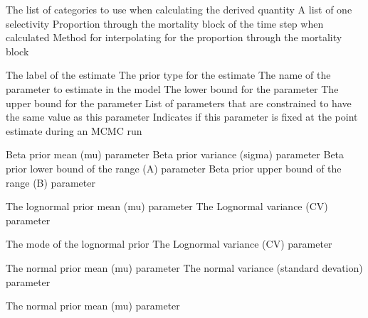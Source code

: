  {The list of categories to use when calculating the derived quantity}
 {A list of one selectivity}
 {Proportion through the mortality block of the time step when calculated}
 {Method for interpolating for the proportion through the mortality block}
\par\textbf{}\par
\par\textbf{}\par
{}\par\par
{} {The label of the estimate}
 {The prior type for the estimate}
 {The name of the parameter to estimate in the model}
 {The lower bound for the parameter}
 {The upper bound for the parameter}
 {List of parameters that are constrained to have the same value as this parameter}
 {Indicates if this parameter is fixed at the point estimate during an MCMC run}
\par\textbf{}\par
{} {Beta prior  mean (mu) parameter}
 {Beta prior variance (sigma) parameter}
 {Beta prior lower bound of the range (A) parameter}
 {Beta prior upper bound of the range (B) parameter}
\par\textbf{}\par
{} {The lognormal prior mean (mu) parameter}
 {The Lognormal variance (CV) parameter}
\par\textbf{}\par
{} {The mode of the lognormal prior}
 {The Lognormal variance (CV) parameter}
\par\textbf{}\par
{} {The normal prior mean (mu) parameter}
 {The normal variance (standard devation) parameter}
\par\textbf{}\par
{} {The normal prior mean (mu) parameter}
